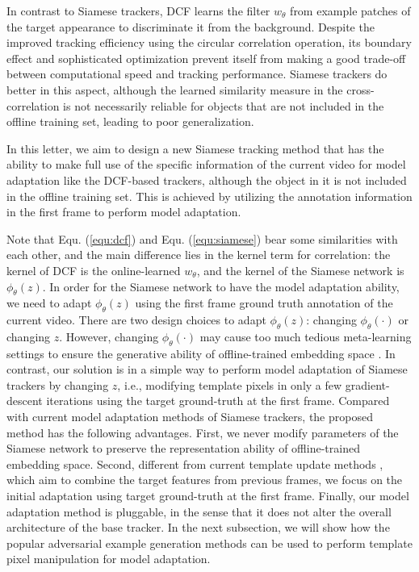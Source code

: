 In contrast to Siamese trackers, DCF learns the filter $w_\theta$ from example patches of the target appearance to discriminate it from the background.
Despite the improved tracking efficiency using the circular correlation operation, its boundary effect and sophisticated optimization prevent itself from making a good trade-off between computational speed and tracking performance. Siamese trackers do better in this aspect, although the learned similarity measure in the cross-correlation is not necessarily reliable for objects that are not included in the offline training set, leading to poor generalization.

In this letter, we aim to design a new Siamese tracking method that has the ability to make full use of the specific information of the current video for model adaptation like the DCF-based trackers, although the object in it is not included in the offline training set. This is achieved by utilizing the annotation information in the first frame to perform model adaptation.

Note that Equ. (\ref{equ:dcf}) and Equ. (\ref{equ:siamese}) bear some similarities with each other, and the main difference lies in the kernel term for correlation: the kernel of DCF is the online-learned $w_{\theta}$, and the kernel of the Siamese network is $\phi_\theta(z)$. In order for the Siamese network to have the model adaptation ability, we need to adapt $\phi_\theta(z)$ using the first frame ground truth annotation of the current video. There are two design choices to adapt $\phi_\theta(z)$: changing $\phi_\theta(\cdot)$ or changing $z$. However, changing $\phi_\theta(\cdot)$ may cause too much tedious meta-learning settings to ensure the generative ability of offline-trained embedding space \cite{ROAM, DBLP:conf/aaai/JungYNCH20}. In contrast, our solution is in a simple way to perform model adaptation of Siamese trackers by changing $z$, i.e., modifying template pixels in only a few gradient-descent iterations using the target ground-truth at the first frame. Compared with current model adaptation methods of Siamese trackers, the proposed method has the following advantages. First, we never modify parameters of the Siamese network to preserve the representation ability of offline-trained embedding space. Second, different from current template update methods \cite{zhu2018distractor, Zhang_2019_ICCV}, which aim to combine the target features from previous frames, we focus on the initial adaptation using target ground-truth at the first frame. Finally, our model adaptation method is pluggable, in the sense that it does not alter the overall architecture of the base tracker. In the next subsection, we will show how the popular adversarial example generation methods can be used to perform template pixel manipulation for model adaptation.


